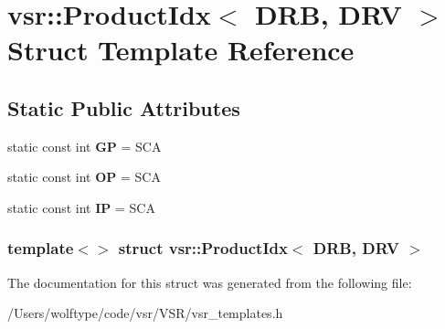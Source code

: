 \hypertarget{structvsr_1_1_product_idx_3_01_d_r_b_00_01_d_r_v_01_4}{\section{vsr\-:\-:Product\-Idx$<$ D\-R\-B, D\-R\-V $>$ Struct Template Reference}
\label{structvsr_1_1_product_idx_3_01_d_r_b_00_01_d_r_v_01_4}
}
\subsection*{Static Public Attributes}
\begin{DoxyCompactItemize}
\item 
\hypertarget{structvsr_1_1_product_idx_3_01_d_r_b_00_01_d_r_v_01_4_a69904dcaf9c207ef754c25b43da18c50}{static const int {\bfseries G\-P} = S\-C\-A}\label{structvsr_1_1_product_idx_3_01_d_r_b_00_01_d_r_v_01_4_a69904dcaf9c207ef754c25b43da18c50}

\item 
\hypertarget{structvsr_1_1_product_idx_3_01_d_r_b_00_01_d_r_v_01_4_aef11f1fb2885aeb09e4778b9893e430e}{static const int {\bfseries O\-P} = S\-C\-A}\label{structvsr_1_1_product_idx_3_01_d_r_b_00_01_d_r_v_01_4_aef11f1fb2885aeb09e4778b9893e430e}

\item 
\hypertarget{structvsr_1_1_product_idx_3_01_d_r_b_00_01_d_r_v_01_4_a7e4d14d9f0b07881266c2d57448a0463}{static const int {\bfseries I\-P} = S\-C\-A}\label{structvsr_1_1_product_idx_3_01_d_r_b_00_01_d_r_v_01_4_a7e4d14d9f0b07881266c2d57448a0463}

\end{DoxyCompactItemize}
\subsubsection*{template$<$$>$ struct vsr\-::\-Product\-Idx$<$ D\-R\-B, D\-R\-V $>$}



The documentation for this struct was generated from the following file\-:\begin{DoxyCompactItemize}
\item 
/\-Users/wolftype/code/vsr/\-V\-S\-R/vsr\-\_\-templates.\-h\end{DoxyCompactItemize}
